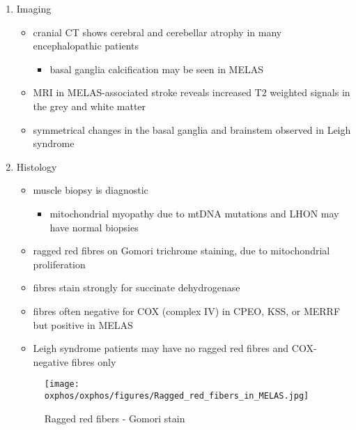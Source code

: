 \documentclass{scrartcl}
\begin{document}
\begin{enumerate}
\item Imaging
\label{sec:org277db02}
\begin{itemize}
\item cranial CT shows cerebral and cerebellar atrophy in many encephalopathic patients
\begin{itemize}
\item basal ganglia calcification may be seen in MELAS
\end{itemize}
\item MRI in MELAS-associated stroke reveals increased T2 weighted signals in the grey and white matter
\item symmetrical changes in the basal ganglia and brainstem observed in Leigh syndrome
\end{itemize}

\item Histology
\label{sec:orge7807ad}
\begin{itemize}
\item muscle biopsy is diagnostic
\begin{itemize}
\item mitochondrial myopathy due to mtDNA mutations and LHON may have normal biopsies
\end{itemize}
\item ragged red fibres on Gomori trichrome staining, due to mitochondrial proliferation
\item fibres stain strongly for succinate dehydrogenase
\item fibres often negative for COX (complex IV) in CPEO, KSS, or MERRF but positive in MELAS
\item Leigh syndrome patients may have no ragged red fibres and  COX-negative fibres only
\end{itemize}

\begin{figure}[htbp]
\centering
\texttt{[image: oxphos/oxphos/figures/Ragged\_red\_fibers\_in\_MELAS.jpg]}
\caption[rrf]{\label{fig:orgf929ebd}Ragged red fibers - Gomori stain}
\end{figure}


\end{enumerate}
\end{document}

